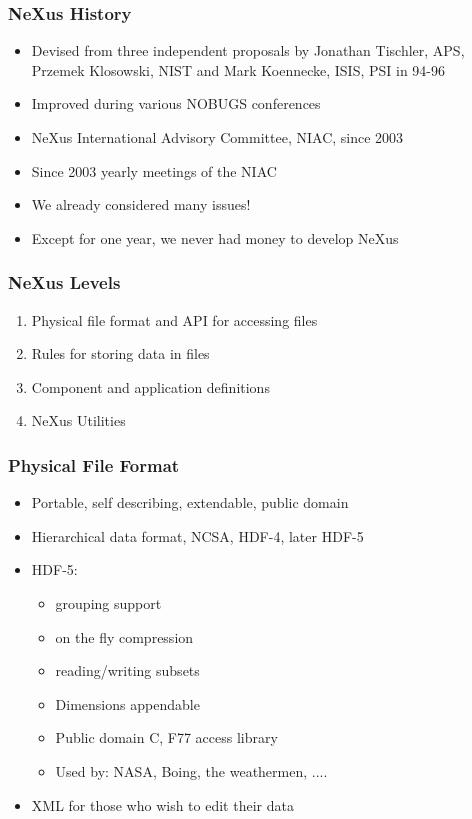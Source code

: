 \documentclass{beamer}
\begin{document}
\begin{frame} \frametitle{NeXus History }
\begin{itemize}
\item Devised from three independent proposals by Jonathan Tischler, 
  APS, Przemek Klosowski, NIST and 
 Mark Koennecke, ISIS, PSI in 94-96
\item Improved during various NOBUGS conferences
\item NeXus International Advisory Committee, NIAC, since 2003
\item Since 2003 yearly meetings of the NIAC
\item We already considered many issues!
\item Except for one year, we never had money to develop NeXus
\end{itemize}
\end{frame}


\begin{frame}
 \frametitle{NeXus Levels }
\begin{enumerate}
\item Physical file format and API for accessing files
\item Rules for storing data in files
\item Component and application definitions
\item NeXus Utilities
\end{enumerate}
\end{frame}


\begin{frame} \frametitle{Physical File Format }
\begin{itemize}
\item Portable, self describing, extendable, public domain
\item Hierarchical data format, NCSA, HDF-4, later HDF-5
\item HDF-5:
\begin{itemize}
\item grouping support
\item on the fly compression
\item reading/writing subsets
\item Dimensions appendable
\item Public domain C, F77 access library
\item Used by: NASA, Boing, the weathermen, .... 
\end{itemize}
\item XML for those who wish to edit their data
\end{itemize}
\end{frame}
\end{document}
